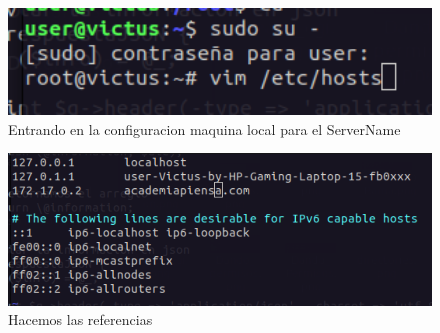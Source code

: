 \begin{figure}[H]
  \centering
  \includegraphics[width=1.0\textwidth]{img/Ingresando_Maq_Local.png}
  \caption{Entrando en la configuracion maquina local para el ServerName}
\end{figure}
\begin{figure}[H]
  \centering
  \includegraphics[width=1.0\textwidth]{img/Conf_Maq_Local.png}
  \caption{Hacemos las referencias}
\end{figure}

